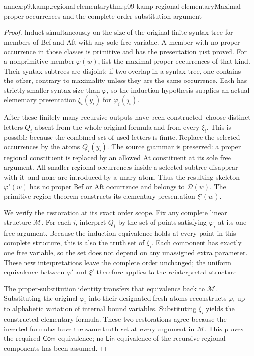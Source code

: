 \begin{annexitem}{annex:p9.kamp.regional.elementary}{thm:p09-kamp-regional-elementary}{Maximal proper occurrences and the complete-order substitution argument}
\begin{proof}
Induct simultaneously on the size of the original finite syntax tree
for members of Bef and Aft with any sole free variable. A member
with no proper occurrence in those classes is primitive and has
the presentation just proved. For a nonprimitive member
\(\varphi(w)\), list the maximal proper occurrences of
that kind. Their syntax subtrees are disjoint: if two overlap
in a syntax tree, one contains the other, contrary to maximality
unless they are the same occurrence. Each has strictly smaller
syntax size than \(\varphi\), so the induction hypothesis
supplies an actual elementary presentation
\(\xi_i(y_i)\) for \(\varphi_i(y_i)\).

After these finitely many recursive outputs have been constructed,
choose distinct letters \(Q_i\) absent from the whole original
formula and from every \(\xi_i\). This is possible because
the combined set of used letters is finite. Replace the selected
occurrences by the atoms \(Q_i(y_i)\). The source grammar is
preserved: a proper regional constituent is replaced by an allowed
At constituent at its sole free argument. All smaller regional
occurrences inside a selected subtree disappear with it, and none
are introduced by a unary atom. Thus the resulting skeleton
\(\varphi'(w)\) has no proper Bef or Aft occurrence and
belongs to \(\mathcal D(w)\). The primitive-region theorem
constructs its elementary presentation \(\xi'(w)\).

We verify the restoration at its exact order scope. Fix any complete
linear structure \(\mathcal M\). For each \(i\), interpret
\(Q_i\) by the set of points satisfying \(\varphi_i\)
at its one free argument. Because the induction equivalence holds
at every point in this complete structure, this is also the truth
set of \(\xi_i\). Each component has exactly one free
variable, so the set does not depend on any unassigned extra
parameter. These new interpretations leave the complete order
unchanged; the uniform equivalence between \(\varphi'\)
and \(\xi'\) therefore applies to the reinterpreted structure.

The proper-substitution identity transfers that equivalence back
to \(\mathcal M\). Substituting the original \(\varphi_i\)
into their designated fresh atoms reconstructs \(\varphi\),
up to alphabetic variation of internal bound variables. Substituting
\(\xi_i\) yields the constructed elementary formula. These
two restorations agree because the inserted formulas have the
same truth set at every argument in \(\mathcal M\).
This proves the required \(\mathsf{Com}\) equivalence;
no \(\mathsf{Lin}\) equivalence of the recursive regional
components has been assumed.


\end{proof}
\end{annexitem}
